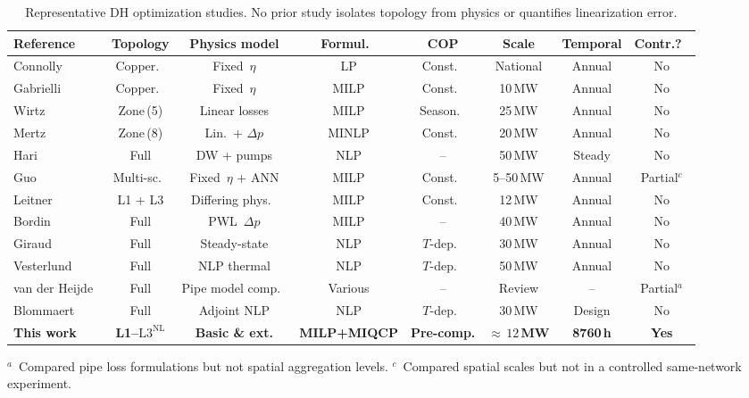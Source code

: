 \documentclass[review,3p]{elsarticle}
\newcommand{\Lnl}{\mathrm{L3}^{\mathrm{NL}}}
\begin{document}
\begin{table}[!htbp]
\centering
\caption{Representative DH optimization studies. No prior study
isolates topology from physics or quantifies linearization error.}
\label{tab:prior_work}
\small
\setlength{\tabcolsep}{4pt}
\begin{tabular}{@{}l c c c c c c c@{}}
\toprule
Reference & Topology & Physics model & Formul.\ & COP &
  Scale & Temporal & Contr.?\ \\
\midrule
Connolly~\cite{Connolly2014_EnergyPLAN}
  & Copper.\ & Fixed~$\eta$ & LP & Const.\ & National & Annual & No \\
Gabrielli~\cite{Gabrielli2018}
  & Copper.\ & Fixed~$\eta$ & MILP & Const.\ & 10\,MW & Annual & No \\
Wirtz~\cite{Wirtz2020}
  & Zone\,(5) & Linear losses & MILP & Season.\ & 25\,MW & Annual & No \\
Mertz~\cite{Mertz2016}
  & Zone\,(8) & Lin.\ + $\Delta p$ & MINLP & Const.\
  & 20\,MW & Annual & No \\
Hari~\cite{Hari2024}
  & Full & DW + pumps & NLP & -- & 50\,MW & Steady & No \\
Guo~\cite{Guo2025}
  & Multi-sc.\ & Fixed~$\eta$ + ANN & MILP & Const.\ & 5--50\,MW
  & Annual & Partial$^{c}$ \\
Leitner~\cite{Leitner2019}
  & L1 + L3 & Differing phys.\ & MILP & Const.\ & 12\,MW
  & Annual & No \\
Bordin~\cite{Bordin2016}
  & Full & PWL~$\Delta p$ & MILP & -- & 40\,MW & Annual & No \\
Giraud~\cite{Giraud2015}
  & Full & Steady-state & NLP & $T$-dep.\ & 30\,MW & Annual & No \\
Vesterlund~\cite{Vesterlund2017}
  & Full & NLP thermal & NLP & $T$-dep.\ & 50\,MW & Annual & No \\
van der Heijde~\cite{vanderHeijde2017}
  & Full & Pipe model comp.\ & Various & -- & Review & --
  & Partial$^{a}$ \\
Blommaert~\cite{Blommaert2020}
  & Full & Adjoint NLP & NLP & $T$-dep.\ & 30\,MW & Design & No \\
\midrule
\textbf{This work}
  & \textbf{L1--$\Lnl$}
  & \textbf{Basic \& ext.}
  & \textbf{MILP+MIQCP}
  & \textbf{Pre-comp.}
  & \textbf{${\approx}\,12$\,MW}
  & \textbf{8760\,h}
  & \textbf{Yes} \\
\bottomrule
\end{tabular}

\vspace{2pt}
\raggedright\footnotesize
$^{a}$~Compared pipe loss formulations but not spatial aggregation
levels.\quad
$^{c}$~Compared spatial scales but not in a controlled same-network
experiment.
\end{table}
\end{document}

